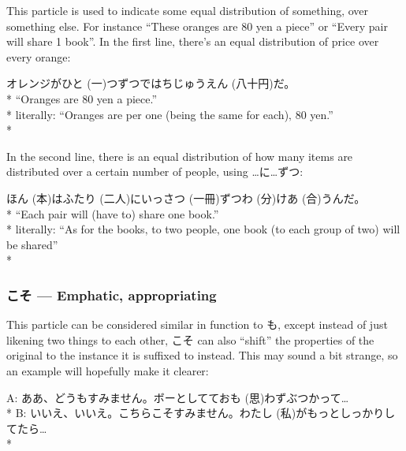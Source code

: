 \documentclass[11pt, b5paper, twoside, openright, onecolumn]{book}
\makeatletter
\newcommand*{\rubystack}[2]{{\relscale{0.5}%
  \begin{tabular}[b]{@{}c@{}}%
    {#1}\\%
   {\textscale{2}{#2}}%
  \end{tabular}}%
}
\DeclareRobustCommand*{\ruby}[2]{%
  \mbox{%
    \setlength{\parskip}{0ex}%
    \BeginAccSupp{method=pdfstringdef,ActualText={#1}}%
      \rubystack{\phantom{#2}}{#1}%
      \llap{%
        \rubystack{#2}{\phantom{#1}}%
      }%
    \EndAccSupp{}%
  }%
}
\renewcommand*{\ruby}[2]{#2 (#1)}%
\newenvironment{exampleblock}{
\setlength{\parindent}{0.6in}
\begin{minipage}[t]{\dimexpr\textwidth-\parindent}}
{\end{minipage}}
\makeatother
\begin{document}
This particle is used to indicate some equal distribution of something‚ over something else. For instance “These oranges are 80 yen a piece” or “Every pair will share 1 book”. In the first line‚ there’s an equal distribution of price over every orange:

\vspace{0.4cm}
\begin{exampleblock}
オレンジが\ruby{一}{ひと}つずつで\ruby{八十円}{はちじゅうえん}だ。 \\* 
“Oranges are 80 yen a piece.” \\* 
literally: “Oranges are per one (being the same for each)‚ 80 yen.” \\* 
\end{exampleblock}
\vspace{0.2cm}

In the second line‚ there is an equal distribution of how many items are distributed over a certain number of people‚ using …に…ずつ:

\vspace{0.4cm}
\begin{exampleblock}
\ruby{本}{ほん}は\ruby{二人}{ふたり}に\ruby{一冊}{いっさつ}ずつ\ruby{分}{わ}け\ruby{合}{あ}うんだ。 \\* 
“Each pair will (have to) share one book.” \\* 
literally: “As for the books‚ to two people‚ one book (to each group of two) will be shared” \\* 
\end{exampleblock}
\subsubsection{こそ — Emphatic‚ appropriating}


This particle can be considered similar in function to も‚ except instead of just likening two things to each other‚ こそ can also “shift” the properties of the original to the instance it is suffixed to instead. This may sound a bit strange‚ so an example will hopefully make it clearer:

\vspace{0.4cm}
\begin{exampleblock}
A: ああ、どうもすみません。ボーとしてて\ruby{思}{おも}わずぶつかって… \\* 
B: いいえ、いいえ。こちらこそすみません。\ruby{私}{わたし}がもっとしっかりしてたら… \\* 
\end{exampleblock}
\vspace{0.2cm}
\end{document}
